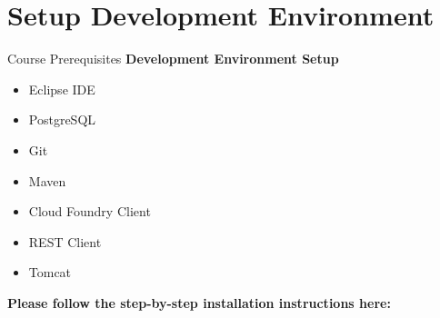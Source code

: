 \part{Setup Development Environment}

\begin{frame}{Course Prerequisites}
\textbf{Development Environment Setup}
\begin{itemize}
\item Eclipse IDE
\item PostgreSQL
\item Git
\item Maven 
\item Cloud Foundry Client
\item REST Client
\item Tomcat
\end{itemize}
\vspace{2 ex}
\textbf{Please follow the step-by-step installation instructions here:}

\end{frame}
